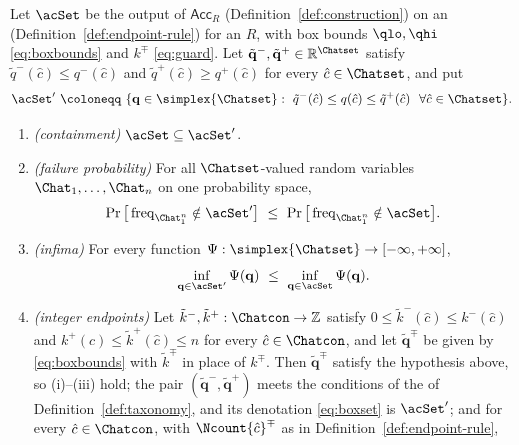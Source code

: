 \begin{lemma}\label{lem:widening}
Let $\acSet$ be the output of $\mathsf{Acc}_R$
(Definition~\ref{def:construction}) on an 
(Definition~\ref{def:endpoint-rule}) for an 
$R$, with box bounds $\qlo,\qhi$ \eqref{eq:boxbounds} and
 $k^{\mp}$ \eqref{eq:guard}. Let
$\tilde{\mathbf{q}}^{-},\tilde{\mathbf{q}}^{+}\in\mathbb{R}^{\Chatset}$
satisfy $\tilde q^{-}(\hat c)\le q^{-}(\hat c)$ and
$\tilde q^{+}(\hat c)\ge q^{+}(\hat c)$ for every $\hat c\in\Chatset$, and put
\begin{equation}\label{eq:widened-set}
  \acSet'\ \coloneqq\ \{\mathbf{q}\in\simplex{\Chatset}:\
  \tilde q^{-}(\hat c)\le q(\hat c)\le\tilde q^{+}(\hat c)\ \
  \forall\hat c\in\Chatset\}.
\end{equation}
\begin{enumerate}[label=(\roman*),leftmargin=2.2em]
\item \emph{(containment)} $\acSet\subseteq\acSet'$.
\item \emph{(failure probability)} For all $\Chatset$-valued random
variables $\Chat_1,\dots,\Chat_n$ on one probability space,
\begin{equation*}
  \Pr\big[\operatorname{freq}_{\Chat_1^n}\notin\acSet'\big]
  \ \le\ \Pr\big[\operatorname{freq}_{\Chat_1^n}\notin\acSet\big].
\end{equation*}
\item \emph{(infima)} For every function
$\Psi:\simplex{\Chatset}\to[-\infty,+\infty]$,
\begin{equation}\label{eq:widened-inf}
  \inf_{\mathbf{q}\in\acSet'}\Psi(\mathbf{q})
  \ \le\ \inf_{\mathbf{q}\in\acSet}\Psi(\mathbf{q}).
\end{equation}
\item \emph{(integer endpoints)} Let
$\tilde k^{-},\tilde k^{+}:\Chatcon\to\mathbb{Z}$ satisfy
$0\le\tilde k^{-}(\hat c)\le k^{-}(\hat c)$ and
$k^{+}(\hat c)\le\tilde k^{+}(\hat c)\le n$ for every $\hat c\in\Chatcon$,
and let $\tilde{\mathbf{q}}^{\mp}$ be given by \eqref{eq:boxbounds} with
$\tilde k^{\mp}$ in place of $k^{\mp}$. Then $\tilde{\mathbf{q}}^{\mp}$
satisfy the hypothesis above, so (i)--(iii) hold; the pair
$(\tilde{\mathbf{q}}^{-},\tilde{\mathbf{q}}^{+})$ meets the conditions of the
\tref{canonical box form} of Definition~\ref{def:taxonomy}, and its
denotation \eqref{eq:boxset} is $\acSet'$; and for every $\hat c\in\Chatcon$,
with $\Ncount{\hat c}^{\mp}$ as in Definition~\ref{def:endpoint-rule},
\begin{equation}\label{eq:widened-tails}

\end{equation}
\end{enumerate}
\end{lemma}
